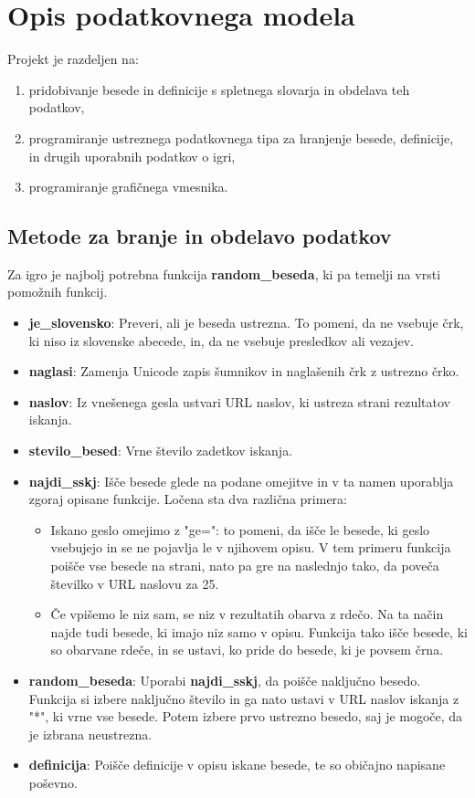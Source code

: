 \documentclass [a4paper, 12pt] {article}
\begin{document}
\section {Opis podatkovnega modela}
Projekt je razdeljen na:
\begin {enumerate}
\item pridobivanje besede in definicije s spletnega slovarja in obdelava teh podatkov,
\item programiranje ustreznega podatkovnega tipa za hranjenje besede, definicije, in drugih uporabnih podatkov o igri,
\item programiranje grafičnega vmesnika.
\end {enumerate}

\subsection {Metode za branje in obdelavo podatkov}
Za igro je najbolj potrebna funkcija \textbf {random\_beseda}, ki pa temelji na vrsti pomožnih funkcij.
\begin {itemize}
\item \textbf {je\_slovensko}: Preveri, ali je beseda ustrezna. To pomeni, da ne vsebuje črk, ki niso iz slovenske abecede, in, da ne vsebuje presledkov ali vezajev.
\item \textbf {naglasi}: Zamenja Unicode zapis šumnikov in naglašenih črk z ustrezno črko.
\item \textbf {naslov}: Iz vnešenega gesla ustvari URL naslov, ki ustreza strani rezultatov iskanja.
\item \textbf {stevilo\_besed}: Vrne število zadetkov iskanja.
\item \textbf {najdi\_sskj}: Išče besede glede na podane omejitve in v ta namen uporablja zgoraj opisane funkcije. Ločena sta dva različna primera:
\begin {itemize}
\item Iskano geslo omejimo z "ge=": to pomeni, da išče le besede, ki geslo vsebujejo in se ne pojavlja le v njihovem opisu. V tem primeru funkcija poišče vse besede na strani, nato pa gre na naslednjo tako, da poveča številko v URL naslovu za 25.
\item Če vpišemo le niz sam, se niz v rezultatih obarva z rdečo. Na ta način najde tudi besede, ki imajo niz samo v opisu. Funkcija tako išče besede, ki so obarvane rdeče, in se ustavi, ko pride do besede, ki je povsem črna.
\end {itemize}
\item \textbf {random\_beseda}: Uporabi \textbf {najdi\_sskj}, da poišče naključno besedo. Funkcija si izbere naključno število in ga nato ustavi v URL naslov iskanja z "*", ki vrne vse besede. Potem izbere prvo ustrezno besedo, saj je mogoče, da je izbrana neustrezna.
\item \textbf {definicija}: Poišče definicije v opisu iskane besede, te so običajno napisane poševno.
\end {itemize} 
\end{document}
